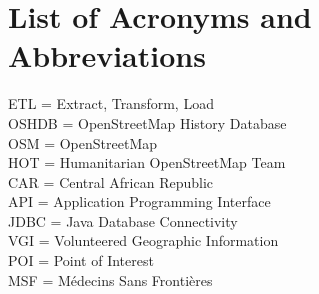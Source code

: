 \chapter*{List of Acronyms and Abbreviations}

ETL = Extract, Transform, Load \\
OSHDB = OpenStreetMap History Database \\
OSM = OpenStreetMap \\
HOT = Humanitarian OpenStreetMap Team \\
CAR = Central African Republic \\
API = Application Programming Interface \\
JDBC = Java Database Connectivity \\
VGI = Volunteered Geographic Information \\
POI = Point of Interest \\
MSF = Médecins Sans Frontières \\

